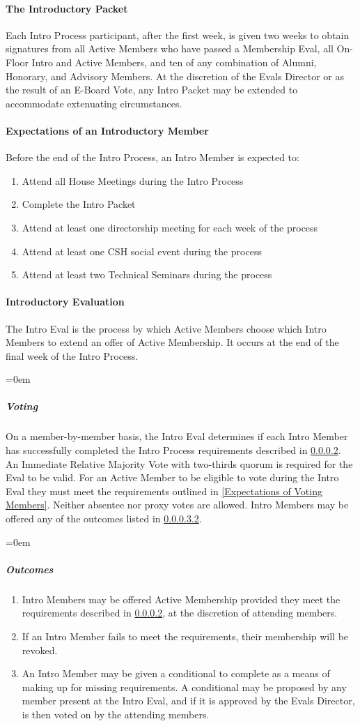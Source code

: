 \documentclass{article}
\newcommand{\asubsubsection}[1]{\paragraph{#1} \label{#1}}
\newcommand{\asubsubsubsection}[1]{\parindent=0em\subparagraph{#1} \label{#1}}
\begin{document}
\asubsubsection{The Introductory Packet}
Each Intro Process participant, after the first week, is given two weeks to obtain signatures from all Active Members who have passed a Membership Eval, all On-Floor Intro and Active Members, and ten of any combination of Alumni, Honorary, and Advisory Members.
At the discretion of the Evals Director or as the result of an E-Board Vote, any Intro Packet may be extended to accommodate extenuating circumstances.

\asubsubsection{Expectations of an Introductory Member}
\renewcommand{\theenumi}{\arabic{enumi}} %
Before the end of the Intro Process, an Intro Member is expected to:
\begin{enumerate}
	\item Attend all House Meetings during the Intro Process
	\item Complete the Intro Packet
	\item Attend at least one directorship meeting for each week of the process
	\item Attend at least one CSH social event during the process
	\item Attend at least two Technical Seminars during the process
\end{enumerate}

\asubsubsection{Introductory Evaluation}
The Intro Eval is the process by which Active Members choose which Intro Members to extend an offer of Active Membership.
It occurs at the end of the final week of the Intro Process.

\asubsubsubsection{Voting}
On a member-by-member basis, the Intro Eval determines if each Intro Member has successfully completed the Intro Process requirements described in \ref{Expectations of an Introductory Member}.
An Immediate Relative Majority Vote with two-thirds quorum is required for the Eval to be valid.
For an Active Member to be eligible to vote during the Intro Eval they must meet the requirements outlined in \ref{Expectations of Voting Members}.
Neither absentee nor proxy votes are allowed.
Intro Members may be offered any of the outcomes listed in \ref{Outcomes}.

\asubsubsubsection{Outcomes}
\renewcommand{\theenumi}{\alph{enumi}} %
\begin{enumerate}
	\item Intro Members may be offered Active Membership provided they meet the requirements described in \ref{Expectations of an Introductory Member}, at the discretion of attending members.
	\item If an Intro Member fails to meet the requirements, their membership will be revoked.
	\item An Intro Member may be given a conditional to complete as a means of making up for missing requirements.
	      A conditional may be proposed by any member present at the Intro Eval, and if it is approved by the Evals Director, is then voted on by the attending members.
\end{enumerate}
\end{document}
